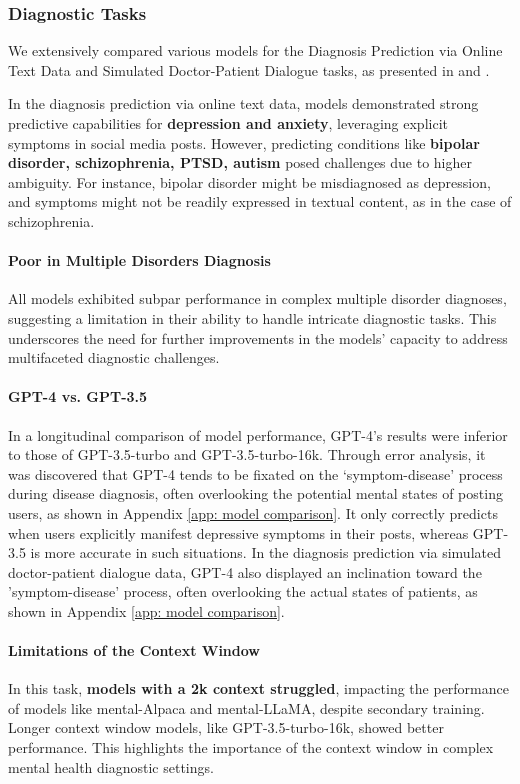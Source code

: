 \subsubsection{Diagnostic Tasks} We extensively compared various models for the Diagnosis Prediction via Online Text Data and Simulated Doctor-Patient Dialogue tasks, as presented in and .%

In the diagnosis prediction via online text data, models demonstrated strong predictive capabilities for \textbf{depression and anxiety}, leveraging explicit symptoms in social media posts. However, predicting conditions like \textbf{bipolar disorder, schizophrenia, PTSD, autism} posed challenges due to higher ambiguity. For instance, bipolar disorder might be misdiagnosed as depression, and symptoms might not be readily expressed in textual content, as in the case of schizophrenia. 

\paragraph{Poor in Multiple Disorders Diagnosis} All models exhibited subpar performance in complex multiple disorder diagnoses, suggesting a limitation in their ability to handle intricate diagnostic tasks. This underscores the need for further improvements in the models' capacity to address multifaceted diagnostic challenges.

\paragraph{GPT-4 vs. GPT-3.5} In a longitudinal comparison of model performance, GPT-4's results were inferior to those of GPT-3.5-turbo and GPT-3.5-turbo-16k. Through error analysis, it was discovered that GPT-4 tends to be fixated on the `symptom-disease' process during disease diagnosis, often overlooking the potential mental states of posting users, as shown in Appendix \ref{app: model comparison}. It only correctly predicts when users explicitly manifest depressive symptoms in their posts, whereas GPT-3.5 is more accurate in such situations. In the diagnosis prediction via simulated doctor-patient dialogue data, GPT-4 also displayed an inclination toward the 'symptom-disease' process, often overlooking the actual states of patients, as shown in Appendix \ref{app: model comparison}.

\paragraph{Limitations of the Context Window} In this task, \textbf{models with a 2k context struggled}, impacting the performance of models like mental-Alpaca and mental-LLaMA, despite secondary training. Longer context window models, like GPT-3.5-turbo-16k, showed better performance. This highlights the importance of the context window in complex mental health diagnostic settings.

